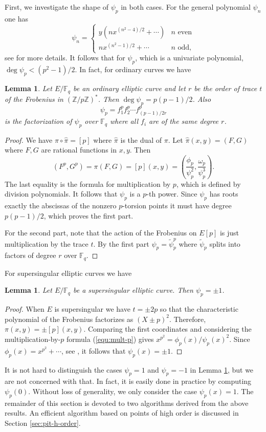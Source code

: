 \documentclass[review]{elsarticle}
\theoremstyle{plain}
\newtheorem{lemma}[theorem]{Lemma}
\theoremstyle{definition}
\def\Z{\ensuremath{\mathbb{Z}}}
\def\F{\ensuremath{\mathbb{F}}}
\begin{document}
First, we investigate the shape of $\psi_p$ in both cases. For the general polynomial $\psi_n$ one 
has
\[
\psi_n =
\begin{cases}
	y(nx^{(n^2 - 4) / 2} + \cdots) & n \text{ even} \\
	nx^{(n^2 - 1) / 2} + \cdots & n \text{ odd},
\end{cases}
\]
see \cite{washington2008} for more details. It follows that for $\psi_p$, which is a univariate 
polynomial, $\deg \psi_p < (p^2 - 1) / 2$. In fact, for ordinary curves we have
\begin{lemma}
	\label{lem:ord_divpoly}
	Let $E/\F_q$ be an ordinary elliptic curve and let $r$ be the order of trace $t$ of the 
	Frobenius in $(\Z / p\Z)^*$. Then $\deg \psi_p = p(p - 1) / 2$. Also
	\[ \psi_p = f_1^pf_2^p \cdots f_{(p - 1) / 2r}^p \]
	is the factorization of $\psi_p$ over $\F_q$ where all $f_i$ are of the same degree $r$.
\end{lemma}
\begin{proof}
	We have $\pi \circ \hat{\pi} = [p]$ where $\hat{\pi}$ is the dual of $\pi$. Let $\hat{\pi}(x, 
	y) = (F, G)$ where $F, G$ are rational functions in $x, y$. Then
	\begin{equation}
	\label{equ:mult-p}
		(F^p, G^p) = \pi(F, G) = [p](x, y) = \left( \frac{\phi_p}{\psi_p^2}, 		
		\frac{\omega_p}{\psi_p^3} \right).
	\end{equation}
	The last equality is the formula for multiplication by $p$, which is defined by division 
	polynomials. It follows that $\psi_p$ is a $p$-th power. Since $\psi_p$ has roots exactly the 
	abscissas of the nonzero $p$-torsion points it must have degree $p(p - 1) / 2$, which proves 
	the first part.
	
	For the second part, note that the action of the Frobenius on $E[p]$ is just multiplication by 
	the trace $t$. By the first part $\psi_p = \tilde{\psi}_p^p$ where $\tilde{\psi}_p$ splits into 
	factors of degree $r$ over $\F_q$.
\end{proof}
For supersingular elliptic curves we have
\begin{lemma}
	\label{lem:ss_divpoly}
	Let $E/\F_q$ be a supersingular elliptic curve. Then $\psi_p = \pm 1$.
\end{lemma}
\begin{proof}
	When $E$ is supersingular we have $t = \pm 2p$ so that the characteristic polynomial of the 
	Frobenius factorizes as $(X \pm p)^2$. Therefore, $\pi(x, y) = \pm [p](x, y)$. Comparing the 
	first coordinates and considering the multiplication-by-$p$ formula (\ref{equ:mult-p}) gives 
	$x^{p^2} = \phi_p(x) / \psi_p(x)^2$. Since $\phi_p(x) = x^{p^2} + \cdots$, see 
	\cite{washington2008}, it follows that $\psi_p(x) = \pm 1$.
\end{proof}
It is not hard to distinguish the cases $\psi_p = 1$ and $\psi_p = -1$ in Lemma 
\ref{lem:ss_divpoly}, but we are not concerned with that. In fact, it is easily done in practice 
by computing $\psi_p(0)$. Without loss of generality, we only consider the case $\psi_p(x) = 1$. 
The remainder of this section is devoted to two algorithms derived from the above results. An 
efficient algorithm based on points of high order is discussed in Section \ref{sec:pit-h-order}.
\end{document}
